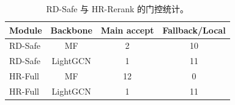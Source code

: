 \begin{table}[t]
\centering
\caption{RD-Safe 与 HR-Rerank 的门控统计。}
\label{tab:gate}
\begin{tabular}{lccc}
\toprule
Module & Backbone & Main accept & Fallback/Local \\
\midrule
RD-Safe & MF & 2 & 10 \\
RD-Safe & LightGCN & 1 & 11 \\
HR-Full & MF & 12 & 0 \\
HR-Full & LightGCN & 1 & 11 \\
\bottomrule
\end{tabular}
\end{table}